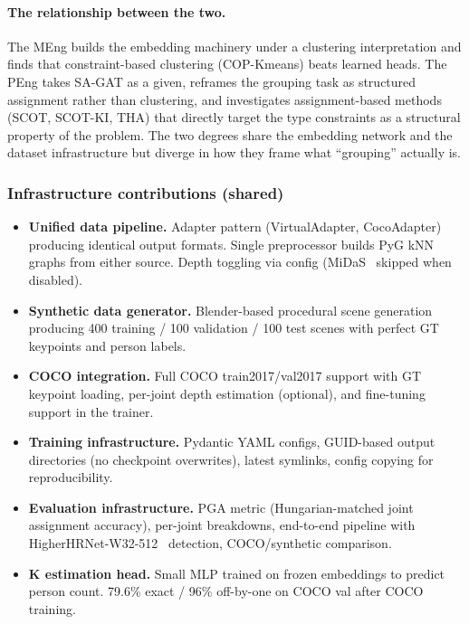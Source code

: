 \paragraph{The relationship between the two.}

The MEng builds the embedding machinery under a clustering interpretation and finds that constraint-based clustering (COP-Kmeans) beats learned heads. The PEng takes SA-GAT as a given, reframes the grouping task as structured assignment rather than clustering, and investigates assignment-based methods (SCOT, SCOT-KI, THA) that directly target the type constraints as a structural property of the problem. The two degrees share the embedding network and the dataset infrastructure but diverge in how they frame what ``grouping'' actually is.


\subsubsection{Infrastructure contributions (shared)}

\begin{itemize}
    \item \textbf{Unified data pipeline.} Adapter pattern (VirtualAdapter, CocoAdapter) producing identical output formats. Single preprocessor builds PyG kNN graphs from either source. Depth toggling via config (MiDaS~\cite{ranftl2020midas} skipped when disabled).
    \item \textbf{Synthetic data generator.} Blender-based procedural scene generation producing 400 training / 100 validation / 100 test scenes with perfect GT keypoints and person labels.
    \item \textbf{COCO integration.} Full COCO train2017/val2017 support with GT keypoint loading, per-joint depth estimation (optional), and fine-tuning support in the trainer.
    \item \textbf{Training infrastructure.} Pydantic YAML configs, GUID-based output directories (no checkpoint overwrites), latest symlinks, config copying for reproducibility.
    \item \textbf{Evaluation infrastructure.} PGA metric (Hungarian-matched joint assignment accuracy), per-joint breakdowns, end-to-end pipeline with HigherHRNet-W32-512~\cite{cheng2020higherhrnet} detection, COCO/synthetic comparison.
    \item \textbf{K estimation head.} Small MLP trained on frozen embeddings to predict person count. 79.6\% exact / 96\% off-by-one on COCO val after COCO training.
\end{itemize}


